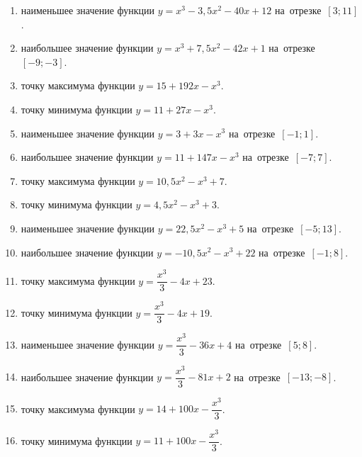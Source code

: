 \documentclass[a4paper,10pt]{article}
\begin{document}
\begin{enumerate}
\item {} наименьшее значение функции $y=x^3 -3,5x^2-40x+12$ на~отрезке~$\left[3;11\right]$.

\item {} наибольшее значение функции $y=x^3 +7,5x^2-42x+1$ на~отрезке~$\left[-9;-3\right]$.

\item {} точку максимума функции $y=15+192x-x^3$.

\item {} точку минимума функции $y=11+27x-x^3$.

\item {} наименьшее значение функции $y=3+3x-x^3$ на~отрезке~$\left[-1;1\right]$.

\item {} наибольшее значение функции $y=11+147x-x^3$ на~отрезке~$\left[-7;7\right]$.

\item {} точку максимума функции $y=10,5x^2-x^3+7$.

\item {} точку минимума функции $y=4,5x^2-x^3+3$.

\item {} наименьшее значение функции $y=22,5x^2-x^3+5$ на~отрезке~$\left[-5;13\right]$.

\item {} наибольшее значение функции $y=-10,5x^2-x^3+22$ на~отрезке~$\left[-1;8\right]$.

\item {} точку максимума функции $y=\dfrac{x^3}{3} -4x+23$.

\item {} точку минимума функции $y=\dfrac{x^3}{3} -4x+19$.

\item {} наименьшее значение функции $y=\dfrac{x^3}{3} -36x+4$ на~отрезке~$\left[5;8\right]$.

\item {} наибольшее значение функции $y=\dfrac{x^3}{3} -81x+2$ на~отрезке~$\left[-13;-8\right]$.

\item {} точку максимума функции $y=14 +100x-\dfrac{x^3}{3}$.

\item {} точку минимума функции $y=11 +100x-\dfrac{x^3}{3}$.


\end{enumerate}
\end{document}

